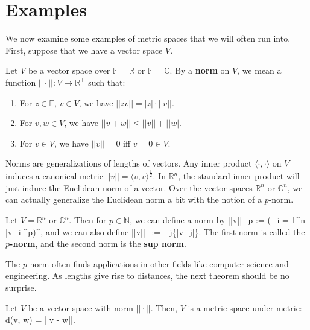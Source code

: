 \newpage
\section{Examples}

	We now examine some examples of metric spaces that we will often run into. First, suppose that we have a vector space $V$.
	
	\begin{definition}[Norm]
		Let $V$ be a vector space over $\mathbb F = \mathbb R$ or $\mathbb F = \mathbb C$. By a \textbf{norm} on $V$, we mean a function $||\cdot|| : V
		\rightarrow\mathbb R^+$ such that:
		\begin{enumerate}
			\item For $z\in\mathbb F$, $v\in V$, we have $||zv|| = |z|\cdot||v||$.
			\item For $v, w\in V$, we have $||v + w||\leq ||v|| + ||w|$.
			\item For $v\in V$, we have $||v|| = 0$ iff $v = 0\in V$.
		\end{enumerate}
	\end{definition}
	
	Norms are generalizations of lengths of vectors. Any inner product $\langle\cdot, \cdot\rangle$ on $V$ induces a canonical metric $||v|| = \langle v, v
	\rangle^{\frac{1}{2}}$. In $\mathbb R^n$, the standard inner product will just induce the Euclidean norm of a vector. Over the vector spaces $\mathbb R^n$ or $
	\mathbb C^n$, we can actually generalize the Euclidean norm a bit with the notion of a $p$-norm.
	
	\begin{prop}
		Let $V = \mathbb R^n$ or $\mathbb C^n$. Then for $p\in\mathbb N$, we can define a norm by
		\eq
			||v||_p := (\sum_{i = 1}^n |v_i|^p)^{},
		\qe
		and we can also define
		\eq
			||v||_\infty := \sup_j\{|v_j|\}.
		\qe
		The first norm is called the \textbf{$p$-norm}, and the second norm is the \textbf{sup norm}.
	\end{prop}
	
	The $p$-norm often finds applications in other fields like computer science and engineering. As lengths give rise to distances, the next theorem should be no 
	surprise.
	
	\begin{theorem}
		Let $V$ be a vector space with norm $||\cdot||$. Then, $V$ is a metric space under metric:
		\eq
			d(v, w) = ||v - w||.
		\qe
	\end{theorem}
	
